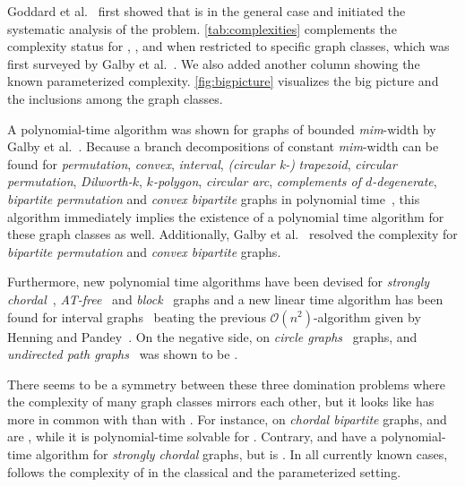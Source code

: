 Goddard et al.~\cite{Goddard2014} first showed that \SDOM is \NPc in the general case and initiated the systematic analysis of the problem.  
\cref{tab:complexities} complements the complexity status for \doms, \sdoms, and \tdoms when restricted to specific graph classes, which was first surveyed by Galby et al.~\cite{Galby2020}.
We also added another column showing the known parameterized complexity. 
\cref{fig:bigpicture} visualizes the big picture and the inclusions among the graph classes.

A polynomial-time algorithm was shown for graphs of bounded \textit{mim}-width by Galby et al.~\cite{Galby2020}.
Because a branch decompositions of constant \textit{mim}-width can be found for \textit{permutation}, \textit{convex}, \textit{interval}, \textit{(circular k-)} \textit{trapezoid}, \textit{circular permutation}, \textit{Dilworth-$k$}, \textit{$k$-polygon}, \textit{circular arc}, \textit{complements of $d$-degenerate}, \textit{bipartite permutation} and \textit{convex bipartite} graphs in polynomial time~\cite{Belmonte2011}, this algorithm immediately implies the existence of a polynomial time algorithm for these graph classes as well. 
Additionally, Galby et al.~\cite{Galby2020} resolved the complexity for \textit{bipartite permutation} and \textit{convex bipartite} graphs.

Furthermore, new polynomial time algorithms have been devised for \textit{strongly chordal}~\cite{Tripathi2021}, \textit{AT-free}~\cite{Kloks2021} and \textit{block}~\cite{Henning2022} graphs and a new linear time algorithm has been found for interval graphs~\cite{Pradhan2021} beating the previous $\mathcal{O}(n^2)$-algorithm given by Henning and Pandey~\cite{Henning2019}.
On the negative side, \sdom on \textit{circle graphs}~\cite{Kloks2021} graphs, and \textit{undirected path graphs}~\cite{Henning2019} was shown to be \NPc.

There seems to be a symmetry between these three domination problems where the complexity of many graph classes mirrors each other, but it looks like \sdoms has more in common with \doms than with \tdoms.
For instance, on \textit{chordal bipartite} graphs, \sdoms and \doms are \NPc, while it is polynomial-time solvable for \tdoms. 
Contrary, \sdoms and \doms have a polynomial-time algorithm for \textit{strongly chordal} graphs, but \tdoms is \NPc.
In all currently known cases, \sdom follows the complexity of \dom in the classical and the parameterized setting.

